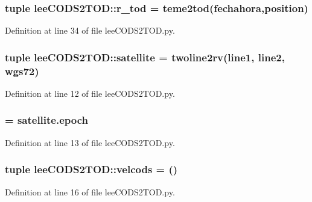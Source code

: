 \subsubsection[{r\-\_\-tod}]{\setlength{\rightskip}{0pt plus 5cm}tuple {\bf lee\-C\-O\-D\-S2\-T\-O\-D\-::r\-\_\-tod} = teme2tod({\bf fechahora},position)}\label{namespacelee_c_o_d_s2_t_o_d_a776a728821127f201bf781cd7239e101}


\-Definition at line 34 of file lee\-C\-O\-D\-S2\-T\-O\-D.\-py.

\subsubsection[{satellite}]{\setlength{\rightskip}{0pt plus 5cm}tuple {\bf lee\-C\-O\-D\-S2\-T\-O\-D\-::satellite} = twoline2rv({\bf line1}, {\bf line2}, wgs72)}\label{namespacelee_c_o_d_s2_t_o_d_adff2085c41374c2d193eb362a619b756}


\-Definition at line 12 of file lee\-C\-O\-D\-S2\-T\-O\-D.\-py.

\subsubsection[{t0}]{ = satellite.\-epoch}\label{namespacelee_c_o_d_s2_t_o_d_aaf8bb3c739d63ab92175a480a306ec53}


\-Definition at line 13 of file lee\-C\-O\-D\-S2\-T\-O\-D.\-py.

\subsubsection[{velcods}]{\setlength{\rightskip}{0pt plus 5cm}tuple {\bf lee\-C\-O\-D\-S2\-T\-O\-D\-::velcods} = ()}\label{namespacelee_c_o_d_s2_t_o_d_ad2b8ba71b75c2557c042962449eb098f}


\-Definition at line 16 of file lee\-C\-O\-D\-S2\-T\-O\-D.\-py.


